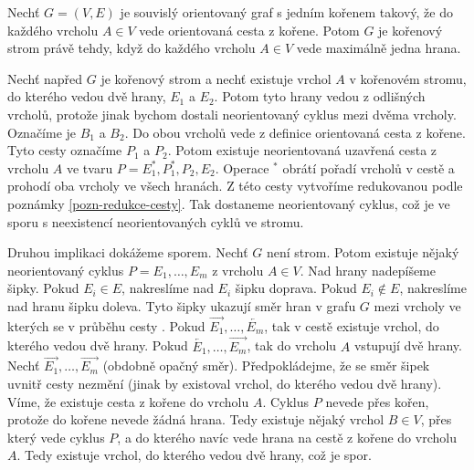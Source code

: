 \begin{lemma}\label{lemma-char-korenoveho-stromu}
    Nechť $G=(V,E)$ je souvislý orientovaný graf s jedním kořenem takový, že do každého vrcholu $A \in V$ vede orientovaná cesta z kořene. Potom $G$ je kořenový strom právě tehdy, když do každého vrcholu $A \in V$ vede maximálně jedna hrana. 
\end{lemma}
\begin{dukaz}
    Nechť napřed $G$ je kořenový strom a nechť existuje vrchol $A$ v kořenovém stromu, do kterého vedou dvě hrany, $E_1$ a $E_2$. Potom tyto hrany vedou z odlišných vrcholů, protože jinak bychom dostali neorientovaný cyklus mezi dvěma vrcholy. Označíme je $B_1$ a $B_2$. Do obou vrcholů vede z definice orientovaná cesta z kořene. Tyto cesty označíme $P_1$ a $P_2$. Potom existuje neorientovaná uzavřená cesta z vrcholu $A$ ve tvaru $P = E_1^*, P_1^*, P_2, E_2$. Operace $^*$ obrátí pořadí vrcholů v cestě a prohodí oba vrcholy ve všech hranách. Z této cesty vytvoříme redukovanou podle poznámky \ref{pozn-redukce-cesty}. 
    Tak dostaneme neorientovaný cyklus, což je ve sporu s neexistencí neorientovaných cyklů ve stromu.

    Druhou implikaci dokážeme sporem. Nechť $G$ není strom. Potom existuje nějaký neorientovaný cyklus $P = E_1, \dots , E_m$ z vrcholu $A \in V$. Nad hrany nadepíšeme šipky. Pokud $E_i \in E$, nakreslíme nad $E_i$ šipku doprava. Pokud $E_i \notin E$, nakreslíme nad hranu šipku doleva. Tyto šipky ukazují směr hran v grafu $G$ mezi vrcholy ve kterých se v průběhu cesty . Pokud $\overrightarrow{E_1}, \dots , \overleftarrow{E_m}$, tak v cestě existuje vrchol, do kterého vedou dvě hrany. Pokud $\overleftarrow{E_1}, \dots , \overrightarrow{E_m}$, tak do vrcholu $A$ vstupují dvě hrany. Nechť $\overrightarrow{E_1}, \dots , \overrightarrow{E_m}$ (obdobně opačný směr). Předpokládejme, že se směr šipek uvnitř cesty nezmění (jinak by existoval vrchol, do kterého vedou dvě hrany). Víme, že existuje cesta z kořene do vrcholu $A$. Cyklus $P$ nevede přes kořen, protože do kořene nevede žádná hrana. Tedy existuje nějaký vrchol $B \in V$, přes který vede cyklus $P$, a do kterého navíc vede hrana na cestě z kořene do vrcholu $A$. Tedy existuje vrchol, do kterého vedou dvě hrany, což je spor. 
\end{dukaz}

